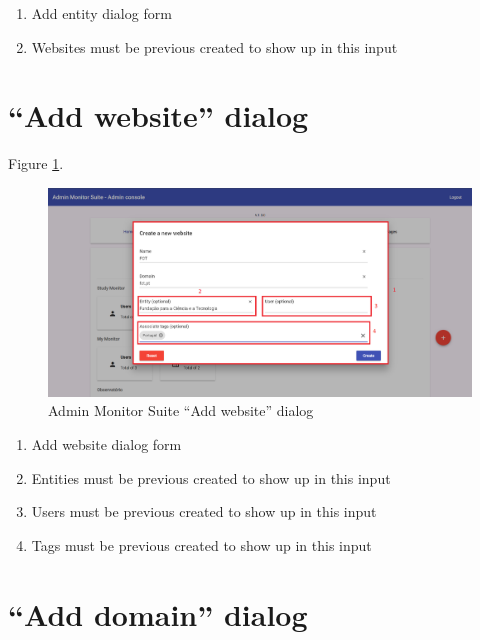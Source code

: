 \begin{enumerate}
    \item Add entity dialog form
    \item Websites must be previous created to show up in this input
\end{enumerate}

\clearpage

\section{``Add website'' dialog}
\label{sec:admin_add_website_dialog}

Figure \ref{fig:admin_add_website_dialog}.

\begin{figure}[H]
    \centering
    \includegraphics[width=\linewidth]{lib/images/admin/admin_add_website_dialog.png}
    \caption{Admin Monitor Suite ``Add website'' dialog}
    \label{fig:admin_add_website_dialog}
\end{figure}

\begin{enumerate}
    \item Add website dialog form
    \item Entities must be previous created to show up in this input
    \item Users must be previous created to show up in this input
    \item Tags must be previous created to show up in this input
\end{enumerate}

\clearpage

\section{``Add domain'' dialog}
\label{sec:admin_add_domain_dialog}

